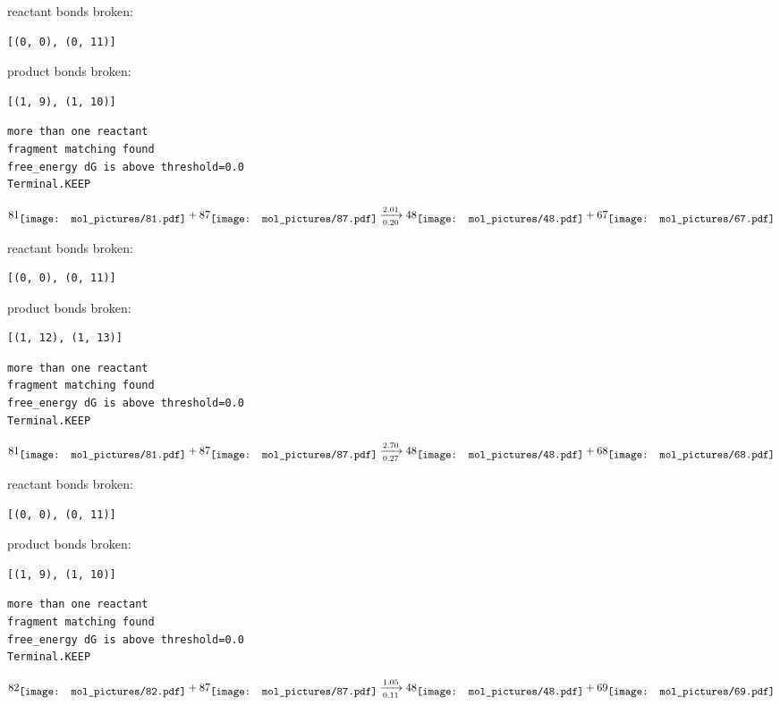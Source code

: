 \documentclass{article}
\begin{document}
reactant bonds broken:\begin{verbatim}
[(0, 0), (0, 11)]
\end{verbatim}
product bonds broken:\begin{verbatim}
[(1, 9), (1, 10)]
\end{verbatim}




\vspace{1cm}
\begin{verbatim}
more than one reactant
fragment matching found
free_energy dG is above threshold=0.0
Terminal.KEEP
\end{verbatim}
$$
81
\raisebox{-.5\height}{\texttt{[image: mol\_pictures/81.pdf]}}
+
87
\raisebox{-.5\height}{\texttt{[image: mol\_pictures/87.pdf]}}
\xrightarrow[0.20]{2.01}
48
\raisebox{-.5\height}{\texttt{[image: mol\_pictures/48.pdf]}}
+
67
\raisebox{-.5\height}{\texttt{[image: mol\_pictures/67.pdf]}}
$$


reactant bonds broken:\begin{verbatim}
[(0, 0), (0, 11)]
\end{verbatim}
product bonds broken:\begin{verbatim}
[(1, 12), (1, 13)]
\end{verbatim}




\vspace{1cm}
\begin{verbatim}
more than one reactant
fragment matching found
free_energy dG is above threshold=0.0
Terminal.KEEP
\end{verbatim}
$$
81
\raisebox{-.5\height}{\texttt{[image: mol\_pictures/81.pdf]}}
+
87
\raisebox{-.5\height}{\texttt{[image: mol\_pictures/87.pdf]}}
\xrightarrow[0.27]{2.70}
48
\raisebox{-.5\height}{\texttt{[image: mol\_pictures/48.pdf]}}
+
68
\raisebox{-.5\height}{\texttt{[image: mol\_pictures/68.pdf]}}
$$


reactant bonds broken:\begin{verbatim}
[(0, 0), (0, 11)]
\end{verbatim}
product bonds broken:\begin{verbatim}
[(1, 9), (1, 10)]
\end{verbatim}




\vspace{1cm}
\begin{verbatim}
more than one reactant
fragment matching found
free_energy dG is above threshold=0.0
Terminal.KEEP
\end{verbatim}
$$
82
\raisebox{-.5\height}{\texttt{[image: mol\_pictures/82.pdf]}}
+
87
\raisebox{-.5\height}{\texttt{[image: mol\_pictures/87.pdf]}}
\xrightarrow[0.11]{1.05}
48
\raisebox{-.5\height}{\texttt{[image: mol\_pictures/48.pdf]}}
+
69
\raisebox{-.5\height}{\texttt{[image: mol\_pictures/69.pdf]}}
$$
\end{document}
